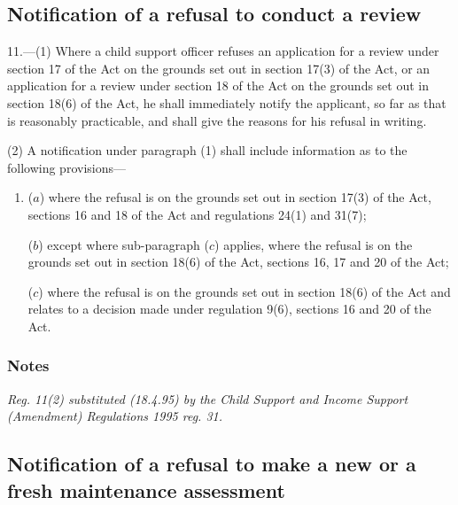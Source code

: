 \documentclass[a4paper]{article}
\newcommand\amendment[1]{\subsubsection*{Notes}{\itshape\frenchspacing\footnotesize #1 \par}}
\begin{document}
\subsection[11. Notification of a refusal to conduct a review]{Notification of a refusal to conduct a review}

11.—(1) Where a child support officer refuses an application for a review under section 17 of the Act on the grounds set out in section 17(3) of the Act, or an application for a review under section 18 of the Act on the grounds set out in section 18(6) of the Act, he shall immediately notify the applicant, so far as that is reasonably practicable, and shall give the reasons for his refusal in writing.

%

(2) A notification under paragraph (1) shall include information as to the following provisions—
\begin{enumerate}\item[]
($a$) where the refusal is on the grounds set out in section 17(3) of the Act, sections 16 and 18 of the Act and regulations 24(1) and 31(7);

($b$) except where sub-paragraph ($c$) applies, where the refusal is on the grounds set out in section 18(6) of the Act, sections 16, 17 and 20 of the Act;

($c$) where the refusal is on the grounds set out in section 18(6) of the Act and relates to a decision made under regulation 9(6), sections 16 and 20 of the Act.
\end{enumerate}

\amendment{
Reg. 11(2) substituted (18.4.95) by the Child Support and Income Support (Amendment) Regulations 1995 reg. 31.
}

\subsection[12. Notification of a refusal to make a new or a fresh maintenance assessment]{Notification of a refusal to make a new or a fresh maintenance assessment}
\end{document}

